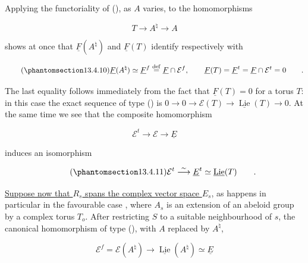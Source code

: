 \noindent
Applying the functoriality of (), as $A$ varies, to the
homomorphisms

\begin{equation*}
 T\longrightarrow A^\natural\longrightarrow A
\end{equation*}

\noindent
shows at once that $\underline F(A^\natural)$ and $\underline F(T)$
identify respectively with

\begin{equation}\tag{\SGARefTarget{sga7.sga7i.eix.n13-4-10}{13.4.10}}
 \underline F(A^\natural)\simeq
 \underline F^f\stackrel{\mathrm{def}}{=}
 \underline F\cap\mathcal E^f,
 \qquad
 \underline F(T)=\underline F^t=
 \underline F\cap\mathcal E^t=0\qquad .
\end{equation}

\noindent
The last equality follows immediately from the fact that
$\underline F(T)=0$ for a torus $T$: in this case the exact sequence of
type () is
$0\longrightarrow0\longrightarrow\mathcal E(T)
\longrightarrow\underline{\operatorname{Lie}}(T)\longrightarrow0$.
At the same time we see that the composite homomorphism

\begin{equation*}
 \mathcal E^t\longrightarrow\mathcal E\longrightarrow\underline E
\end{equation*}

\noindent
induces an isomorphism

\begin{equation}\tag{\SGARefTarget{sga7.sga7i.eix.n13-4-11}{13.4.11}}
 \mathcal E^t\stackrel{\sim}{\longrightarrow}\underline E^t
 \simeq\underline{\operatorname{Lie}}(T)\qquad .
\end{equation}

\noindent
\underline{Suppose now that $R_s$ spans the complex vector space $E_s$},
as happens in particular in the favourable case , where $A_s$ is
an extension of an abeloid group by a complex torus $T_o$.  After
restricting $S$ to a suitable neighbourhood of $s$, the canonical
homomorphism of type (), with $A$ replaced by $A^\natural$,

\begin{equation*}
 \mathcal E^f=\mathcal E(A^\natural)
 \longrightarrow\underline{\operatorname{Lie}}(A^\natural)
 \simeq\underline E
\end{equation*}

